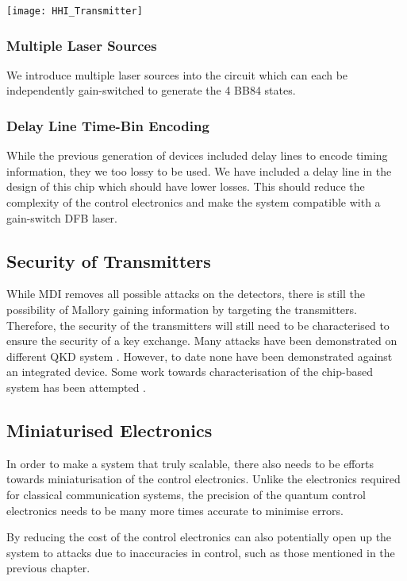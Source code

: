 \begin{sidewaysfigure}
	\centering
	\texttt{[image: HHI\_Transmitter]}
	\caption[Latest generation InP QKD Transmitter]{Latest generation HHI indium phosphide transmitter. The \SI[product-units=power]{6x4}{mm} chip contains a few ways to create BB84 states for QKD. Firstly, we have designs to compare \ac{dfb} and \ac{DBR} lasers. Secondly, we can use a delay line to separate the time bins. Finally, we have multiplexed lasers to pulse independently lasers for each state.}
\end{sidewaysfigure}

\subsubsection*{Multiple Laser Sources}

We introduce multiple laser sources into the circuit which can each be independently gain-switched to generate the 4 BB84 states. 

\subsubsection*{Delay Line Time-Bin Encoding}

While the previous generation of devices included delay lines to encode timing information, they we too lossy to be used. We have included a delay line in the design of this chip which should have lower losses. This should reduce the complexity of the control electronics and make the system compatible with a gain-switch DFB laser.

\subsection{Security of Transmitters}

While \ac{MDI} removes all possible attacks on the detectors, there is still the possibility of Mallory gaining information by targeting the transmitters. Therefore, the security of the transmitters will still need to be characterised to ensure the security of a key exchange. Many attacks have been demonstrated on different \ac{QKD} system \cite{makarov2019}. However, to date none have been demonstrated against an integrated device. Some work towards characterisation of the chip-based system has been attempted \cite{vaquero2018}.

\subsection{Miniaturised Electronics}

In order to make a system that truly scalable, there also needs to be efforts towards miniaturisation of the control electronics. Unlike the electronics required for classical communication systems, the precision of the quantum control electronics needs to be many more times accurate to minimise errors.

By reducing the cost of the control electronics can also potentially open up the system to attacks due to inaccuracies in control, such as those mentioned in the previous chapter. 

